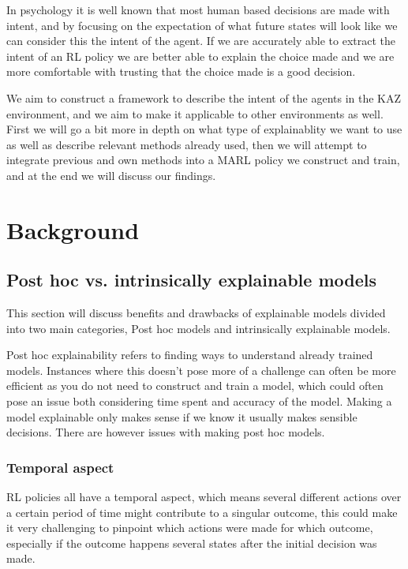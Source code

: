 \documentclass[UKenglish]{uiomasterthesis}
\begin{document}
In psychology it is well known that most human based decisions are made with intent\cite{inbook}, and by focusing on the expectation of what future states will look like we can consider this the intent of the agent. If we are accurately able to extract the intent of an RL policy we are better able to explain the choice made and we are more comfortable with trusting that the choice made is a good decision.

We aim to construct a framework to describe the intent of the agents in the KAZ environment, and we aim to make it applicable to other environments as well. First we will go a bit more in depth on what type of explainablity we want to use as well as describe relevant methods already used, then we will attempt to integrate previous and own methods into a MARL policy we construct and train, and at the end we will discuss our findings.

\medskip
\chapter{Background}

\section{Post hoc vs. intrinsically explainable models}
This section will discuss benefits and drawbacks of explainable models divided into two main categories, Post hoc models and intrinsically explainable models.

Post hoc explainability refers to finding ways to understand already trained models. Instances where this doesn't pose more of a challenge can often be more efficient as you do not need to construct and train a model, which could often pose an issue both considering time spent and accuracy of the model. Making a model explainable only makes sense if we know it usually makes sensible decisions. There are however issues with making post hoc models.

\subsection{ Temporal aspect}
RL policies all have a temporal aspect, which means several different actions over a certain period of time might contribute to a singular outcome, this could make it very challenging to pinpoint which actions were made for which outcome, especially if the outcome happens several states after the initial decision was made.
\end{document}
